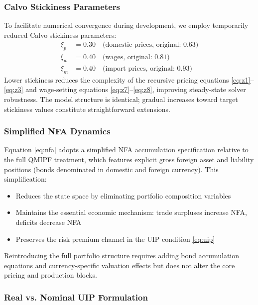 \documentclass[12pt]{article}
\begin{document}
\subsubsection{Calvo Stickiness Parameters}

To facilitate numerical convergence during development, we employ temporarily reduced Calvo stickiness parameters:
\begin{align*}
\xi_p &= 0.30 \quad \text{(domestic prices, original: 0.63)} \\
\xi_w &= 0.40 \quad \text{(wages, original: 0.81)} \\
\xi_m &= 0.40 \quad \text{(import prices, original: 0.93)}
\end{align*}
Lower stickiness reduces the complexity of the recursive pricing equations \eqref{eq:z1}--\eqref{eq:z3} and wage-setting equations \eqref{eq:z7}--\eqref{eq:z8}, improving steady-state solver robustness. The model structure is identical; gradual increases toward target stickiness values constitute straightforward extensions.

\subsubsection{Simplified NFA Dynamics}

Equation \eqref{eq:nfa} adopts a simplified NFA accumulation specification relative to the full QMIPF treatment, which features explicit gross foreign asset and liability positions (bonds denominated in domestic and foreign currency). This simplification:
\begin{itemize}
\item Reduces the state space by eliminating portfolio composition variables
\item Maintains the essential economic mechanism: trade surpluses increase NFA, deficits decrease NFA
\item Preserves the risk premium channel in the UIP condition \eqref{eq:uip}
\end{itemize}
Reintroducing the full portfolio structure requires adding bond accumulation equations and currency-specific valuation effects but does not alter the core pricing and production blocks.

\subsubsection{Real vs. Nominal UIP Formulation}
\end{document}
